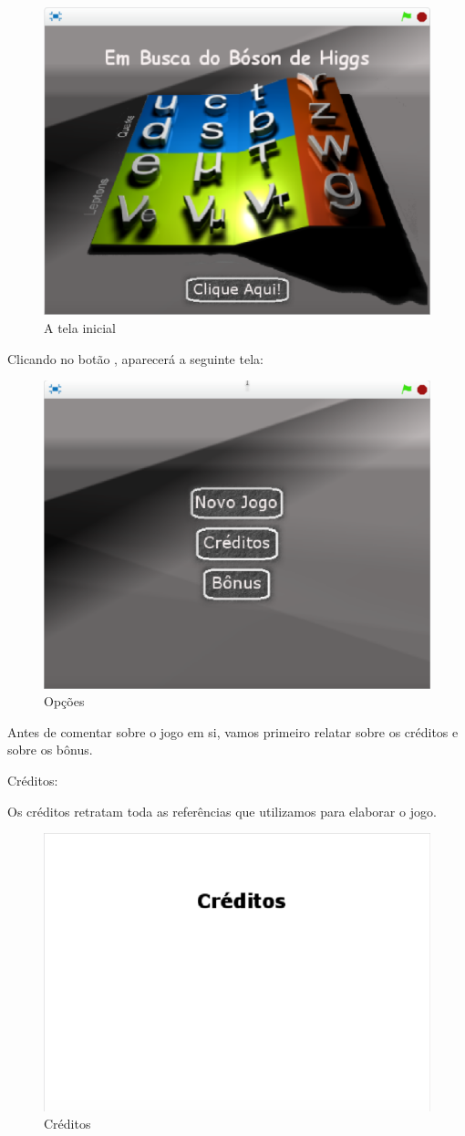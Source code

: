 \documentclass[12pt,fleqn]{book} %
\begin{document}
\begin{figure}[h]
	\centering
	\includegraphics[width=0.65 \textwidth]{Produto/tela_inicial}
	\caption{A tela inicial}
	\label{fig:app_a:telainicial}
\end{figure}

Clicando no botão , aparecerá a seguinte tela:

\begin{figure}[h]
	\centering
	\includegraphics[width=0.65 \textwidth]{Produto/options}
	\caption{Opções}
	\label{fig:app_a:options}
\end{figure}

\newpage

Antes de comentar sobre o jogo em si, vamos primeiro relatar sobre os créditos e sobre os bônus.

Créditos:

Os créditos retratam toda as referências que utilizamos para elaborar o jogo.

\begin{figure}[h]
	\centering
	\includegraphics[width=0.65 \textwidth]{Produto/credits}
	\caption{Créditos}
	\label{fig:app_a:credits}
\end{figure}
\end{document}
